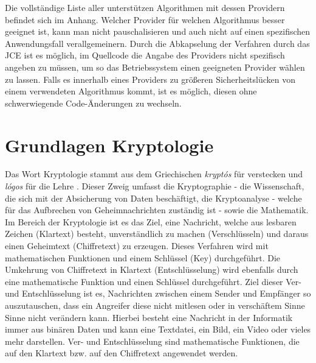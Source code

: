 \documentclass[10pt, a4paper,headsepline,pointednumbers]{scrreprt}
\begin{document}
Die vollständige Liste aller unterstützen Algorithmen mit dessen Providern befindet sich im Anhang. Welcher Provider für welchen Algorithmus besser geeignet ist, kann man nicht pauschalisieren und auch nicht auf einen spezifischen Anwendungsfall verallgemeinern. Durch die Abkapselung der Verfahren durch das JCE ist es möglich, im Quellcode die Angabe des Providers nicht spezifisch angeben zu müssen, um so das Betriebssystem einen geeigneten Provider wählen zu lassen. Falls es innerhalb eines Providers zu größeren Sicherheitslücken von einem verwendeten Algorithmus kommt, ist es möglich, diesen ohne schwerwiegende Code-Änderungen zu wechseln. 


\chapter{Grundlagen Kryptologie}
Das Wort Kryptologie stammt aus dem Griechischen \textit{kryptós} für verstecken und \textit{lógos} für die Lehre \cite{website:duden-crypto, website:duden-logie}.
Dieser Zweig umfasst die Kryptographie - die Wissenschaft, die sich mit der Absicherung von Daten beschäftigt, die Kryptoanalyse - welche für das Aufbrechen von Geheimnachrichten zuständig ist - sowie die Mathematik.
Im Bereich der Kryptologie ist es das Ziel, eine Nachricht, welche aus lesbaren Zeichen (Klartext) besteht, unverständlich zu machen (Verschlüsseln) und daraus einen Geheimtext (Chiffretext) zu erzeugen. Dieses Verfahren wird mit mathematischen Funktionen und einem Schlüssel (Key) durchgeführt. Die Umkehrung von Chiffretext in Klartext (Entschlüsselung) wird ebenfalls durch eine mathematische Funktion und einen Schlüssel durchgeführt. Ziel dieser Ver- und Entschlüsselung ist es, Nachrichten zwischen einem Sender und Empfänger so auszutauschen, dass ein Angreifer diese nicht mitlesen oder in verschäftem Sinne Sinne nicht verändern kann. Hierbei besteht eine Nachricht in der Informatik immer aus binären Daten und kann eine Textdatei, ein Bild, ein Video oder vieles mehr darstellen. Ver- und Entschlüsselung sind mathematische Funktionen, die auf den Klartext bzw. auf den Chiffretext angewendet werden. 
\end{document}
